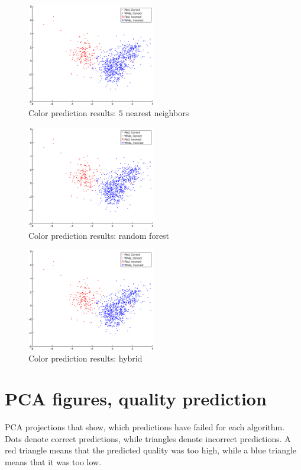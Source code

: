 \documentclass[twoside]{article}
\begin{document}
\begin{multicols}{2}
\begin{figure}[H]
\centering
\includegraphics[width=0.5\textwidth]{colorpca/knn5}
\caption{Color prediction results: $5$ nearest neighbors}
\end{figure}

\begin{figure}[H]
\centering
\includegraphics[width=0.5\textwidth]{colorpca/random_forest}
\caption{Color prediction results: random forest}
\end{figure}

\begin{figure}[H]
\centering
\includegraphics[width=0.5\textwidth]{colorpca/cvv2f_f}
\caption{Color prediction results: hybrid}
\end{figure}

\section{PCA figures, quality prediction}\label{appendix:qualitypcakuvet}
PCA projections that show, which predictions have failed for each algorithm.
Dots denote correct predictions, while triangles denote incorrect predictions.
A red triangle means that the predicted quality was too high, while a blue
triangle means that it was too low. 


\end{multicols}
\end{document}
